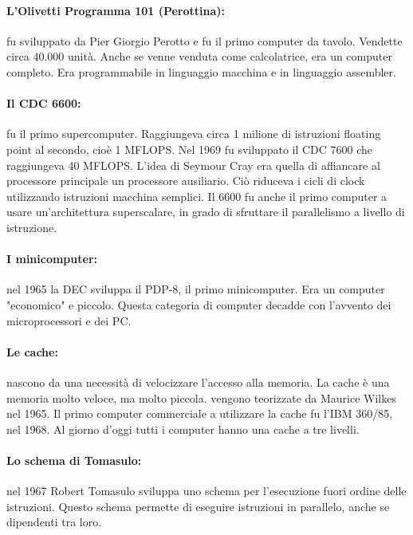 \paragraph{L'Olivetti Programma 101 (Perottina):} fu sviluppato da
Pier Giorgio Perotto e fu il primo computer da tavolo. Vendette circa
40.000 unità. Anche se venne venduta come calcolatrice, era un computer
completo. Era programmabile in linguaggio macchina e in linguaggio
assembler.


\paragraph{Il CDC 6600:} fu il primo supercomputer. Raggiungeva circa 
1 milione di istruzioni floating point al secondo, cioè 1 MFLOPS. Nel 1969
fu sviluppato il CDC 7600 che raggiungeva 40 MFLOPS.
L'idea di Seymour Cray era quella di affiancare al processore principale
un processore ausiliario. Ciò riduceva i cicli di clock utilizzando istruzioni
macchina semplici. Il 6600 fu anche il primo computer a usare un'architettura
superscalare, in grado di sfruttare il parallelismo a livello di istruzione.


\paragraph{I minicomputer:} nel 1965 la DEC sviluppa il PDP-8, il primo
minicomputer. Era un computer "economico" e piccolo. Questa categoria di 
computer decadde con l'avvento dei microprocessori e dei PC.

\paragraph{Le cache:} nascono da una necessità di velocizzare l'accesso
alla memoria. La cache è una memoria molto veloce, ma molto piccola. vengono
teorizzate da Maurice Wilkes nel 1965. Il primo computer commerciale a utilizzare
la cache fu l'IBM 360/85, nel 1968. Al giorno d'oggi tutti i computer hanno una
cache a tre livelli.

\paragraph{Lo schema di Tomasulo:} nel 1967 Robert Tomasulo sviluppa uno schema
per l'esecuzione fuori ordine delle istruzioni. Questo schema permette di eseguire
istruzioni in parallelo, anche se dipendenti tra loro. 


